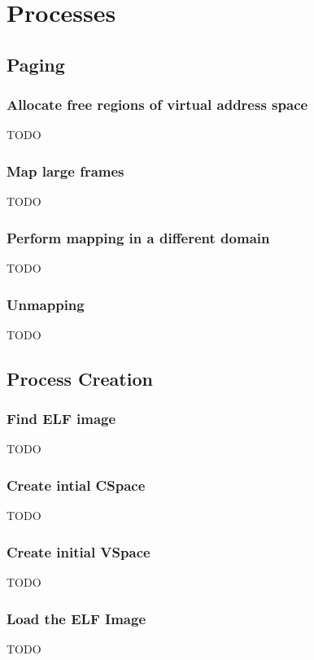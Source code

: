 \section{Processes}

\subsection{Paging}

\subsubsection{Allocate free regions of virtual address space}
TODO

\subsubsection{Map large frames}
TODO

\subsubsection{Perform mapping in a different domain}
TODO

\subsubsection{Unmapping}
TODO

\subsection{Process Creation}

\subsubsection{Find ELF image}
TODO

\subsubsection{Create intial CSpace}
TODO

\subsubsection{Create initial VSpace}
TODO

\subsubsection{Load the ELF Image}
TODO

